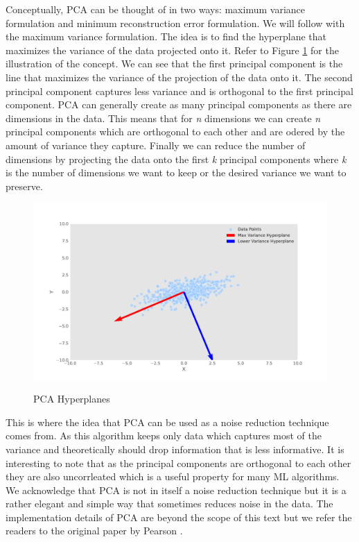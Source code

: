 Conceptually, \ac{PCA} can be thought of in two ways: maximum variance formulation
and minimum reconstruction error formulation. We will follow with the maximum variance formulation.
The idea is to find the hyperplane that maximizes the variance of the data projected onto it.
Refer to Figure \ref{fig:pca} for the illustration of the concept. We can see
that the first principal component is the line that maximizes the variance of the projection
of the data onto it. The second principal component captures
less variance and is orthogonal to the first principal component. \ac{PCA} can
generally create as many principal components as there are dimensions in the data.
This means that for \textit{n} dimensions we can create \textit{n} principal components which
are orthogonal to each other and are odered by the amount of variance they capture. 
Finally we can reduce the number of dimensions by projecting the data onto the first \textit{k} principal components
where \textit{k} is the number of dimensions we want to keep or the desired variance 
we want to preserve.

\begin{figure}[!h]
    \centering
    \caption{\ac{PCA} Hyperplanes}
        \includegraphics[width=1\textwidth]{Figures/pca_plot.pdf}
    \label{fig:pca}
\end{figure}

This is where the idea that \ac{PCA} can be used as a noise reduction technique comes from.
As this algorithm keeps only data which captures most of the variance
and theoretically should drop information that is less informative.
It is interesting to note that as the principal components are orthogonal to each other 
they are also uncorrleated which is a useful property for many \ac{ML} algorithms. 
We acknowledge that \ac{PCA} is not in itself a noise reduction technique
but it is a rather elegant and simple way that sometimes reduces noise in the data.
The implementation details of \ac{PCA} are beyond the scope of this text but we refer the readers
to the original paper by Pearson \cite{Pearson1901}.





